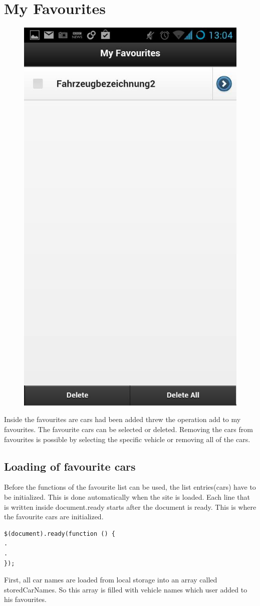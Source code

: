 \section{My Favourites}
\begin{figure}[H]
\centering
\includegraphics[width=0.4\linewidth]{graphics/chapter4/15}
\caption{}
\label{fig:16}
\end{figure}

Inside the favourites are cars had been added threw the operation add to my favourites. The favourite cars can be selected or deleted. Removing the cars from favourites is possible by selecting the specific vehicle or removing all of the cars.
\\

\subsection{Loading of favourite cars}
Before the functions of the favourite list can be used, the list entries(cars) have to be initialized. This is done automatically when the site is loaded. Each line that is written inside document.ready starts after the document is ready. This is where the favourite cars are initialized.
\\
\begin{lstlisting}[language=html, caption= 
start timer function,captionpos=b]
$(document).ready(function () {
.
.
});
\end{lstlisting}

First, all car names are loaded from local storage into an array called storedCarNames. So this array is filled with vehicle names which user added to his favourites. 
\\

